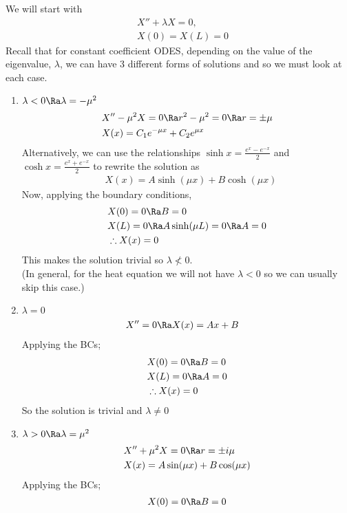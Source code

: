 We will start with
\begin{align*}
    &X''+\lambda X=0,\\
    &X(0)=X(L)=0
\end{align*}
Recall that for constant coefficient ODES, depending on the value of the eigenvalue, $\lambda$, we can have 3 different forms of solutions and so we must look at each case.
\begin{enumerate}
    \item $\lambda<0\Ra \lambda=-\mu^2$
    \begin{align*}
        &X''-\mu^2X=0\Ra r^2-\mu^2=0\Ra r=\pm\mu\\
        &X(x)=C_1e^{-\mu x}+C_2e^{\mu x}
    \end{align*}
    Alternatively, we can use the relationships $\sinh x=\frac{e^x-e^{-x}}{2}$ and $\cosh x=\frac{e^x+e^{-x}}{2}$ to rewrite the solution as
    \begin{align*}
        &X(x)=A\sinh(\mu x)+B\cosh(\mu x)
    \end{align*}
    Now, applying the boundary conditions,
    \begin{align*}
        &X(0)=0\Ra B=0\\
        &X(L)=0\Ra A\sinh(\mu L)=0\Ra A=0\\
        &\therefore X(x)=0
    \end{align*}
    This makes the solution trivial so $\lambda\nless0$.\\
    (In general, for the heat equation we will not have $\lambda<0$ so we can usually skip this case.)
    \item $\lambda=0$
    \begin{align*}
        &X''=0\Ra X(x)=Ax+B
    \end{align*}
    Applying the BCs;
    \begin{align*}
        &X(0)=0\Ra B=0\\
        &X(L)=0\Ra A=0\\
        &\therefore X(x)=0
    \end{align*}
    So the solution is trivial and $\lambda\neq 0$
    \item $\lambda>0\Ra \lambda=\mu^2$
    \begin{align*}
        &X''+\mu^2X=0\Ra r=\pm i\mu\\
        &X(x)=A\sin(\mu x)+B\cos(\mu x)
    \end{align*}
    Applying the BCs;
    \begin{align*}
        &X(0)=0\Ra B=0\\

\end{align*}
\end{enumerate}
